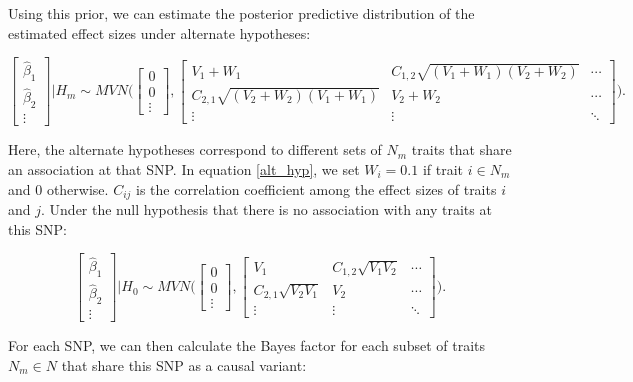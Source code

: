 \documentclass{article}
\begin{document}
\noindent Using this prior, we can estimate the posterior predictive distribution of the estimated effect sizes under alternate hypotheses:

\begin{equation}
\label{alt_hyp}
\begin{bmatrix}
\hat{\beta}_1 \\
\hat{\beta}_2 \\
\vdots
\end{bmatrix} | H_m
\sim MVN \Bigg(
\begin{bmatrix}
0 \\
0 \\
\vdots
\end{bmatrix},
\begin{bmatrix}
V_1 + W_1 & C_{1,2} \sqrt{(V_1 + W_1) (V_2 + W_2)} & \cdots \\
C_{2,1} \sqrt{(V_2 + W_2) (V_1 + W_1)} & V_2 + W_2 & \cdots \\
\vdots & \vdots & \ddots
\end{bmatrix}
\Bigg).
\end{equation}

\noindent Here, the alternate hypotheses correspond to different sets of $N_m$ traits that share an association at that SNP. In equation \ref{alt_hyp}, we set $W_i = 0.1$ if trait $i \in N_m$ and 0 otherwise. $C_{ij}$ is the correlation coefficient among the effect sizes of traits $i$ and $j$. Under the null hypothesis that there is no association with any traits at this SNP:

\begin{equation}
\label{null_hyp}
\begin{bmatrix}
\hat{\beta}_1 \\
\hat{\beta}_2 \\
\vdots
\end{bmatrix} | H_0
\sim MVN \Bigg(
\begin{bmatrix}
0 \\
0 \\
\vdots
\end{bmatrix},
\begin{bmatrix}
V_1 & C_{1,2} \sqrt{V_1 V_2} & \cdots \\
C_{2,1} \sqrt{V_2 V_1} & V_2 & \cdots \\
\vdots & \vdots & \ddots
\end{bmatrix}
\Bigg).
\end{equation}


\noindent For each SNP, we can then calculate the Bayes factor for each subset of traits $N_m \in N$ that share this SNP as a causal variant:
\end{document}
